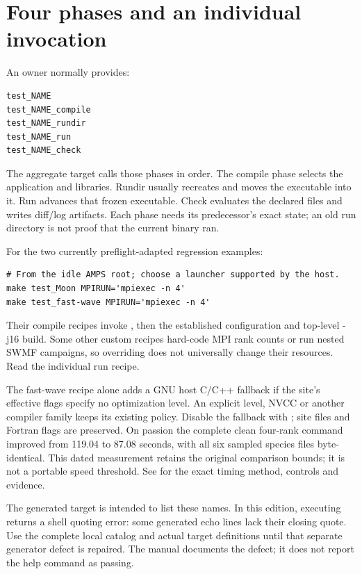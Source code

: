 \section{Four phases and an individual invocation}
An owner normally provides:
\begin{lstlisting}
test_NAME
test_NAME_compile
test_NAME_rundir
test_NAME_run
test_NAME_check
\end{lstlisting}
The aggregate target calls those phases in order. The compile phase selects
the application and libraries. Rundir usually recreates
 and moves the executable into it. Run advances that
frozen executable. Check evaluates the declared files and writes diff/log
artifacts. Each phase needs its predecessor's exact state; an old run
directory is not proof that the current binary ran.

For the two currently preflight-adapted regression examples:
\begin{lstlisting}
# From the idle AMPS root; choose a launcher supported by the host.
make test_Moon MPIRUN='mpiexec -n 4'
make test_fast-wave MPIRUN='mpiexec -n 4'
\end{lstlisting}
Their compile recipes invoke
, then the established
configuration and top-level -j16 build. Some other custom recipes hard-code
MPI rank counts or run nested SWMF campaigns, so overriding 
does not universally change their resources. Read the individual run recipe.

The fast-wave recipe alone adds a GNU host C/C++  fallback if the
site's effective flags specify no optimization level. An explicit level,
NVCC or another compiler family keeps its existing policy. Disable the
fallback with ; site files and Fortran flags are
preserved. On passion the complete clean four-rank command improved from
119.04 to 87.08 seconds, with all six sampled species files byte-identical.
This dated measurement retains the original comparison bounds; it is not a
portable speed threshold. See  for the exact
timing method, controls and evidence.

The generated  target is intended to list these names.
In this edition, executing  returns a shell quoting error:
some generated echo lines lack their closing quote. Use the complete local
catalog and actual target definitions until that separate generator defect
is repaired. The manual documents the defect; it does not report the help
command as passing.


